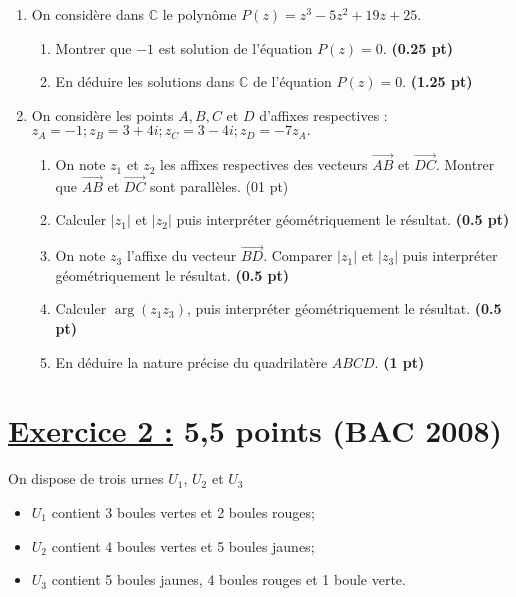 \documentclass[12pt,a4paper]{article}
\begin{document}
\begin{enumerate}
    \item On considère dans \( \mathbb{C} \) le polynôme \( P(z) = z^3 - 5z^2 + 19z + 25 \).
    \begin{enumerate}
        \item Montrer que \( -1 \) est solution de l’équation \( P(z) = 0 \). \hfill \textbf{(0.25 pt)}
        \item En déduire les solutions dans \( \mathbb{C} \) de l’équation \( P(z) = 0 \). \hfill \textbf{(1.25 pt)}
    \end{enumerate}
    \item On considère les points \( A, B, C \) et \( D \) d’affixes respectives :
    \(
    z_A = -1 ; z_B = 3 + 4i ; z_C = 3 - 4i ; z_D = -7z_A.
    \)
    \begin{enumerate}
        \item On note \( z_1 \) et \( z_2 \) les affixes respectives des vecteurs \( \overrightarrow{AB} \) et \( \overrightarrow{DC} \). Montrer que \( \overrightarrow{AB} \) et \( \overrightarrow{DC} \) sont parallèles. \hfill (01 pt)
        \item Calculer \( |z_1| \) et \( |z_2| \) puis interpréter géométriquement le résultat. \hfill \textbf{(0.5 pt)}
        \item On note \( z_3 \) l’affixe du vecteur \( \overrightarrow{BD} \). Comparer \( |z_1| \) et \( |z_3| \) puis interpréter géométriquement le résultat. \hfill \textbf{(0.5 pt)}
        \item Calculer \( \arg (z_1 z_3) \), puis interpréter géométriquement le résultat. \hfill \textbf{(0.5 pt)}
        \item En déduire la nature précise du quadrilatère \( ABCD \). \hfill \textbf{(1 pt)}
    \end{enumerate}
\end{enumerate}
\section*{\underline{Exercice 2 :} 5,5 points (BAC 2008)}

On dispose de trois urnes $U_1$, $U_2$ et $U_3$ 

\begin{itemize}
    \item $U_1$ contient 3 boules vertes et 2 boules rouges;
    \item $U_2$ contient 4 boules vertes et 5 boules jaunes;
    \item $U_3$ contient 5 boules jaunes, 4 boules rouges et 1 boule verte.
\end{itemize}
\end{document}
